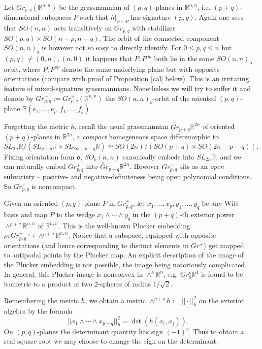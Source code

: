 \documentclass[12pt]{amsart}
\theoremstyle{definition}
\theoremstyle{remark}
\newcommand{\fo}{\mathfrak{o}}
\newcommand{\bR}{\mathbb{R}}
\begin{document}
Let $Gr_{p,q}(\bR^{n,n})$ be the grassmannian of $(p,q)$-planes in $\bR^{n,n}$, i.e. $(p+q)$-dimensional subspaces $P$ such that $h|_{P\times P}$ has signature $(p,q)$. Again one sees that $SO(n,n)$ acts transitively on $Gr_{p,q}$ with stabilizer $SO(p,q)\times SO(n-p,n-q)$. The orbit of the connected component $SO(n,n)_o$ is however not so easy to directly identify. For $0\leq p,q \leq n$ but $(p,q) \neq (0,n), (n,0)$ it happens that $P, P^{op}$ both lie in the same $SO(n,n)_o$ orbit, where $P,P^{op}$ denote the same underlying plane but with opposite orientations (compare with proof of Proposition \ref{cal} below). This is an irritating feature of mixed-signature grassmannians. Nonetheless we will try to suffer it and denote by $Gr_{p,q}^+:=Gr_{p,q}^+(\bR^{n,n})$ the $SO(n,n)_o$-orbit of the oriented $(p,q)$-plane $\bR(e_1, \ldots, e_p, f_1, \ldots, f_q)$.  

Forgetting the metric $h$, recall the usual grassmannian $\tilde{Gr}_{p+q}\bR^{2n}$ of oriented $(p+q)$-planes in $\bR^{2n}$, a \emph{compact} homogeneous space diffeomorphic to $$SL_{2n}\bR / (SL_{p+q}\bR \times SL_{2n-p-q}\bR) \simeq SO(2n) / (SO(p+q) \times SO(2n-p-q)).$$ Fixing orientation form $\fo$, $SO_o(n,n)$ canonically embeds into $SL_{2n}\bR$, and we can naturally embed $Gr_{p,q}^+$ into $\tilde{Gr}_{p+q}\bR^{2n}$. However $Gr_{p,q}^+$ sits as an \emph{open} subvariety -- positive- and negative-definiteness being open polynomial conditions. So $Gr_{p,q}^+$ is noncompact. 


Given an oriented $(p,q)$-plane $P$ in $Gr_{p,q}^+$, let $x_1, \ldots, x_p, y_1, \ldots, y_q$ be any Witt basis and map $P$ to the wedge $x_1 \wedge \cdots \wedge y_q$ in the $(p+q)$-th exterior power $\wedge^{p+q} \bR^{n,n}$ of $\bR^{n,n}$. This is the well-known Plucker embedding $\rho: Gr_{p,q}^+ \hookrightarrow \wedge^{p+q} \bR^{n,n}$. Notice that a subspace, equipped with opposite orientations (and hence corresponding to distinct elements in $Gr^+$) get mapped to antipodal points by the Plucker map. An explicit description of the image of the Plucker embedding is not possible, the image being notoriously complicated. In general, this Plucker image is nonconvex in $\wedge^k \bR^n$, e.g. $Gr_2^o \bR^4$ is found to be isometric to a product of two $2$-spheres of radius $1/ \sqrt{2}$. 

Remembering the metric $h$, we obtain a metric $\wedge^{p+q} h:=|| \cdot ||_h^2$ on the exterior algebra by the formula $$||x_1 \wedge \cdots \wedge x_{p+q}||_h^2=\det (h(x_i, x_j)).$$ On $(p,q)$-planes the determinant quantity has sign $(-1)^q$. Thus to obtain a real square root we may choose to change the sign on the determinant. 
\end{document}
